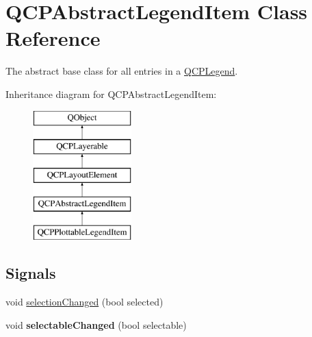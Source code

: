 \hypertarget{classQCPAbstractLegendItem}{}\section{Q\+C\+P\+Abstract\+Legend\+Item Class Reference}
\label{classQCPAbstractLegendItem}


The abstract base class for all entries in a \hyperlink{classQCPLegend}{Q\+C\+P\+Legend}.  


Inheritance diagram for Q\+C\+P\+Abstract\+Legend\+Item\+:\begin{figure}[H]
\begin{center}
\leavevmode
\includegraphics[height=5.000000cm]{classQCPAbstractLegendItem}
\end{center}
\end{figure}
\subsection*{Signals}
\begin{DoxyCompactItemize}
\item 
void \hyperlink{classQCPAbstractLegendItem_a7cb61fdfbaf69c590bacb8f9e7099d9e}{selection\+Changed} (bool selected)
\item 
\hypertarget{classQCPAbstractLegendItem_abc4d779b938cc9235f9196737dbaa6bd}{}void {\bfseries selectable\+Changed} (bool selectable)\label{classQCPAbstractLegendItem_abc4d779b938cc9235f9196737dbaa6bd}

\end{DoxyCompactItemize}
